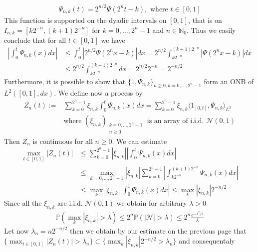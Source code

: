 \documentclass[11pt,a4paper, final]{article}
\theoremstyle{definition}
\begin{document}
\begin{align*}
\Psi_{n,k}(t) = 2^{n/2} \Psi(2^n t-k), \text{ where } t \in [0,1]
\end{align*}
This function is supported on the dyadic intervals on $[0,1]$, that is on \\ $I_{n,k} = [k 2^{-n}, (k+1)2^{-n}]$ for $k=0, \dots , 2^n-1$ and $n \in \mathbb{N}_0$. Thus we easily conclude that for all $t \in [0,1]$ we have 
\begin{align*}
\left| \int_0^t \Psi_{n,k}(x) dx \right| &\leq \int_0^t | 2^{n/2} \Psi(2^n x-k ) |dx = 2^{n/2} \int_{k2^{-n}}^{(k+1)2^{-n}} |\Psi(2^n x-k)|dx
 \\ &\leq 2^{n/2} \int_{k2^{-n}}^{(k+1)2^{-n}} dx = 2^{n/2} 2^{-n} = 2^{-n/2}
\end{align*}
Furthermore, it is possible to show that $\lbrace 1, \Psi_{n,k} \rbrace_{n \geq 0, k =0, \dots , 2^n-1}$ form an ONB of $L^2([0,1], dx)$. We define now a process by
\begin{align*}
Z_n(t) :=& \sum_{k=0}^{2^n-1} \xi_{n,k} \int_0^t \Psi_{n,k}(x) dx = \sum_{k=0}^{2^n-1} \xi_{n,k} \langle 1_{[0,t]}, \Psi_{n,k} \rangle_{L^2} \\ 
& \text{where } (\xi_{n,k})_{ \substack{ k = 0, \dots , 2^n-1 \\ n \geq 0 }} \text{ is an array of i.i.d. } \mathcal{N}(0,1)
\end{align*}
Then $Z_n$ is continuous for all $n \geq 0$. We can estimate 
\begin{align*}
\max_{t \in [0,1]} |Z_n(t)|  &\leq \sum_{k=0}^{2^n-1} | \xi_{n,k} | \left| \int_0^t \Psi_{n,k}(x) dx \right| \\ & \leq \max_{k =0, \dots , 2^n-1} |\xi_{n,k}| \sum_{k=0}^{2^n-1} \left| \int_{k2^{-n}}^{(k+1)2^{-n}} \Psi_{n,k}(x) dx \right|  \\
&\leq \max_k | \xi_{n,k}|  \left| \int_0^1 \Psi_{n,k}(x) dx \right| \leq  \max_{k} | \xi_{n,k} | 2^{-n/2}
\end{align*}
\newpage
Since all the $\xi_{n,k}$ are i.i.d. $\mathcal{N}(0,1)$ we obtain for arbitrary $\lambda >0$ 
\begin{align*}
\mathbb{P}( \max_k | \xi_{n,k}| > \lambda ) \leq 2^n \mathbb{P}( | \mathcal{N}| > \lambda) \leq 2^n \frac{e^{- \lambda^2/2}}{\lambda}
\end{align*}
Let now $\lambda_n = n 2^{-n/2}$ then we obtain by our estimate on the previous page that $\lbrace \max_{t \in [0,1]} | Z_n(t) | > \lambda_n \rbrace \subset \lbrace \max_k | \xi_{n,k} | 2^{-n/2}  > \lambda_n \rbrace$ and consequentaly 
\end{document}

